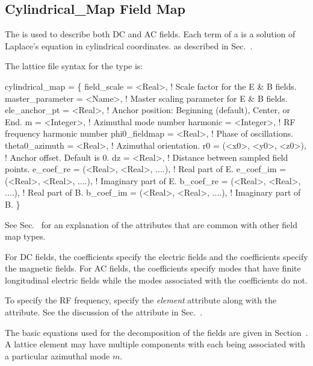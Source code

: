 \subsection{Cylindrical_Map Field Map}
\label{s:cylind.map}

The  is used to describe both DC and AC fields. Each term of a
 is a solution of Laplace's equation in cylindrical coordinates.  as described
in Sec.~.

The lattice file syntax for the  type is:
\begin{example}
  cylindrical_map = \{
    field_scale      = <Real>,    ! Scale factor for the E & B fields.
    master_parameter = <Name>,    ! Master scaling parameter for E & B fields.
    ele_anchor_pt    = <Real>,    ! Anchor position: Beginning (default), Center, or End.
    m                = <Integer>, ! Azimuthal mode number
    harmonic         = <Integer>, ! RF frequency harmonic number 
    phi0_fieldmap    = <Real>,    ! Phase of oscillations.
    theta0_azimuth   = <Real>,    ! Azimuthal orientation.
    r0               = (<x0>, <y0>, <z0>), ! Anchor offset. Default is 0.
    dz        = <Real>,                    ! Distance between sampled field points.
    e_coef_re = (<Real>, <Real>, ....),    ! Real part of E.
    e_coef_im = (<Real>, <Real>, ....),    ! Imaginary part of E.
    b_coef_re = (<Real>, <Real>, ....),    ! Real part of B.
    b_coef_im = (<Real>, <Real>, ....),    ! Imaginary part of B.
  \}
\end{example}
See Sec.~ for an explanation of the attributes that are common with
other field map types.

For DC fields, the  coefficients specify the electric fields and the  coefficients
specify the magnetic fields. For AC fields, the  coefficients specify modes that have finite
longitudinal electric fields while the modes associated with the  coefficients do not.

To specify the RF frequency, specify the  {\em element} attribute along with
the  attribute. See the discussion of the  attribute in 
Sec.~.

The basic equations used for the  decomposition of the fields are given in
Section~. A lattice element may have multiple 
components with each  being associated with a particular azimuthal mode $m$.

